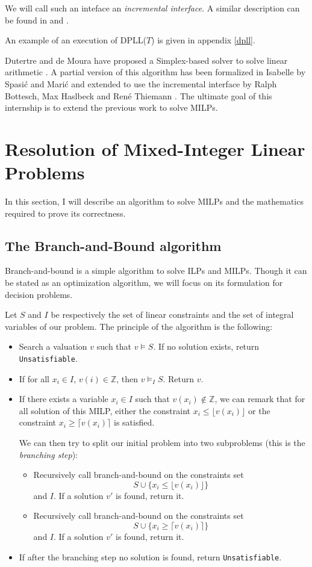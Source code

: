\documentclass{article}
\newcommand{\cunsat}{\texttt{Unsatisfiable}}
\newcommand{\ints}{\mathbb{Z}}
\begin{document}
We will call such an inteface an \textit{incremental interface}.
A similar description can be found in \cite{Dutertre2006} and
\cite{Thiemann2018,BHT2019}.

An example of an execution of DPLL($T$) is given in appendix \ref{dpll}.

Dutertre and de Moura have proposed a Simplex-based solver to solve linear
arithmetic \cite{Dutertre2006}. A partial version of this algorithm has been
formalized in Isabelle by Spasić and Marić \cite{Spasic2012} and extended to
use the incremental interface by Ralph Bottesch, Max Haslbeck and René Thiemann
\cite{Thiemann2018,BHT2019}. The ultimate goal of this internship is to extend the
previous work to solve MILPs.

\section{Resolution of Mixed-Integer Linear Problems}
In this section, I will describe an algorithm to solve MILPs and the mathematics
required to prove its correctness.

\subsection{The Branch-and-Bound algorithm}
\label{bbdescr}
Branch-and-bound is a simple algorithm to solve ILPs and MILPs. Though it can be
stated as an optimization algorithm, we will focus on its formulation for
decision problems.

Let $S$ and $I$ be respectively the set of linear constraints and the set of
integral variables of our problem. The principle of the algorithm is the
following:
\begin{itemize}
  \item Search a valuation $v$ such that $v \vDash S$. If no solution exists,
    return \cunsat{}.
  \item If for all $x_i \in I$, $v(i) \in \ints$, then $v \vDash_I S$.
    Return $v$.
  \item If there exists a variable $x_i \in I$ such that
    $v(x_i) \notin \ints$, we can remark that for all solution of this
    MILP, either the constraint $x_i \leqslant \lfloor v(x_i) \rfloor$ 
    or the constraint $x_i \geqslant \lceil v(x_i) \rceil$ is satisfied.
    
    We can then try to split our initial problem into two subproblems (this is
    the \textit{branching step}):
    \begin{itemize}
      \item Recursively call branch-and-bound on the constraints set
        $$S \cup \{x_i \leqslant \lfloor v(x_i) \rfloor\}$$ and $I$.
        If a solution $v'$ is found, return it.
      \item Recursively call branch-and-bound on the constraints set
        $$S \cup \{x_i \geqslant \lceil v(x_i) \rceil\}$$ and $I$.
        If a solution $v'$ is found, return it.
    \end{itemize}
  \item If after the branching step no solution is found, return \cunsat{}.
\end{itemize}
\end{document}
